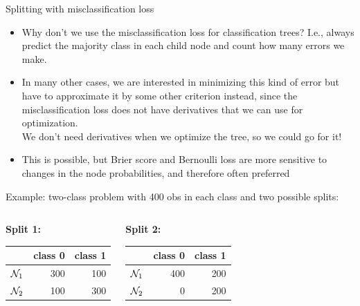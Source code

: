 \begin{vbframe}{Splitting with misclassification loss}

\begin{itemize}
\item Why don't we use the misclassification loss for classification trees? I.e., always predict the majority class in each child node and count how many errors we make.
\item In many other cases, we are interested in minimizing this kind of error but have to approximate it by some other criterion instead, since the misclassification loss does not have derivatives that we can use for optimization.\\
We don't need derivatives when we optimize the tree, so we could go for it!
\item This is possible, but Brier score and Bernoulli loss are more sensitive to changes in the node probabilities, and  therefore often preferred
\end{itemize}

\framebreak

Example: two-class problem with 400 obs in each class and two possible splits:
\begin{small}
\begin{columns}[T,onlytextwidth]
\begin{center}
\textbf{Split 1:} \\
\vspace{0.25cm}
\begin{table}[ht]
\centering
\begin{tabular}{rrr}
  \hline
 & class 0 & class 1 \\ 
  \hline
$\mathcal{N}_1$ & 300 & 100 \\ 
  $\mathcal{N}_2$ & 100 & 300 \\ 
   \hline
\end{tabular}
\end{table}

\end{center}
\begin{center}
\textbf{Split 2:} \\
\vspace{0.25cm}
\begin{table}[ht]
\centering
\begin{tabular}{rrr}
  \hline
 & class 0 & class 1 \\ 
  \hline
$\mathcal{N}_1$ & 400 & 200 \\ 
  $\mathcal{N}_2$ &   0 & 200 \\ 
   \hline
\end{tabular}
\end{table}


\end{center}
\end{columns}
\end{small}
\end{vbframe}
